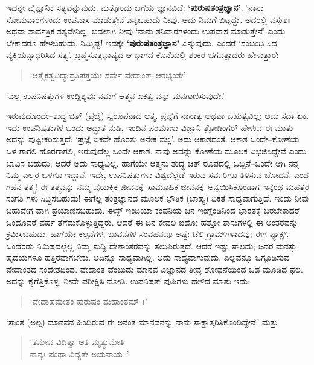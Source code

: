ಇದನ್ನೇ ವೈಜ್ಞಾನಿಕ ಸತ್ಯವೆನ್ನುವುದು. ಮತ್ತೊಂದು ಬಗೆಯ ಜ್ಞಾನವಿದೆ: \textbf{‘ಪುರುಷತಂತ್ರಜ್ಞಾನ’}. ‘ನಾನು ಸೋಮವಾರಗಳಂದು ಉಪವಾಸ ಮಾಡುತ್ತೇನೆ’ಎನ್ನಬಹುದು ನೀವು. ಅದು ನಿಮಗೆ ಬಿಟ್ಟದ್ದು. ಅದರಲ್ಲಿ ವಸ್ತುಶಃ ಅಥವಾ ಸಾರ್ವತ್ರಿಕ ಸತ್ಯವೇನಿಲ್ಲ. ಬದಲಾಗಿ ನೀವು ‘ನಾನು ಶನಿವಾರಗಳಂದು ಉಪವಾಸ ಮಾಡುತ್ತೇನೆ’ ಎಂದು ಬೇಕಾದರೂ ಹೇಳಬಹುದು. ನಿಮ್ಮಿಷ್ಟ! ಇದಕ್ಕೇ \textbf{‘ಪುರುಷತಂತ್ರಜ್ಞಾನ’} ಎನ್ನುವುದು. ಎಂದರೆ ‘ಸಂಬಂಧಿ ಸಿದ ವ್ಯಕ್ತಿಯನ್ನಾಧರಿಸಿದ ಸತ್ಯ’. ಬ್ರಹ್ಮಸೂತ್ರಭಾಷ್ಯದ ಆ ಭಾಗದ ಕೊನೆಯಲ್ಲಿ ಶಂಕರ ಭಗವತ್ಪಾದರು ಹೇಳುತ್ತಾರೆ:

\begin{verse}
‘ಆತ್ಮೈಕತ್ವವಿದ್ಯಾಪ್ರತಿಪತ್ತಯೇ ಸರ್ವೇ ವೇದಾಂತಾ ಆರಭ್ಯಂತೇ’
\end{verse}

‘ಎಲ್ಲ ಉಪನಿಷತ್ತುಗಳ ಉದ್ದಿಶ್ಯವೂ ನಮಗೆ ಆತ್ಮನ ಏಕತ್ವ ವನ್ನು ಮನಗಾಣಿಸುವುದೇ.’

ಇರುವುದೊಂದೇ–ಶುದ್ಧ ಚಿತ್ (ಪ್ರಜ್ಞೆ) ಸ್ವರೂಪನಾದ ಆತ್ಮ. ಪ್ರಜ್ಞೆಗೆ ನಾನಾತ್ವ ಅಥವಾ ಬಹುತ್ವವಿಲ್ಲ; ಅದು ಸದಾ ಏಕ. ಇದು ಉಪನಿಷತ್ತುಗಳ ಒಂದು ಅದ್ಭುತ ನುಡಿ. ಇಂದಿನ ಪರಮಾಣು ವಿಜ್ಞಾನಿ ಶ್ರೋಡಿಂಗರ್ ಹೇಳುವ ಈ ಮಾತು ಅದನ್ನು ಪುಷ್ಟೀಕರಿಸುತ್ತದೆ: ‘ಪ್ರಜ್ಞೆ ಏಕವೇ ಹೊರತು ಅನೇಕ ವಲ್ಲ’. ಅದು ಆಕಾಶದಂತೆ. ಆಕಾಶ ಒಂದೇ–ಕೋಣೆಯ ಒಳ ಗಾಗಲಿ ಹೊರಗಾಗಲಿ, ಇರುವುದೆಲ್ಲ ಒಂದೇ ಆಕಾಶ. ನಾವು ಅದನ್ನು ಕೋಣೆಯ ಮೂಲಕ ವಿಭಜಿಸಿದ್ದೇವೆ ಎಂದು ಬಾವಿಸ ಬಹುದು; ಆದರೆ ಅದು ಸಾಧ್ಯವಿಲ್ಲ. ಹಾಗೆಯೇ ಆತ್ಮನು ಶುದ್ಧ ಚಿತ್ ರೂಪದಲ್ಲಿ ಒಬ್ಬನೆ–ಒಂದೇ ಆಗಿ ನನ್ನ ನಿಮ್ಮ ಎಲ್ಲರ ಒಳಗೂ ಇದ್ದಾನೆ. ಇದೇ, ಉಪನಿಷತ್ತುಗಳು ವಿಶ್ವದೆಲ್ಲೆಡೆ ಇರುವ ಸರ್ವರಿಗೂ ತಿಳಿಸುವ ಬೋಧನೆ. ಎಂಥ ಗಹನ ತತ್ತ್ವ! ಈ ತತ್ತ್ವವನ್ನು ನಮ್ಮ ವೈಯಕ್ತಿಕ ಜೀವನಕ್ಕೆ–ಸಾಮೂಹಿಕ ಜೀವನಕ್ಕೆ–ಅನ್ವಯಿಸಿಕೊಂಡಾಗ ಇನ್ನೆಂಥ ಮಹತ್ತರ ಸಂಗತಿ ಗಳು ಸಿದ್ಧಿಸಬಹುದು! ಈಗೆಲ್ಲ ತಂತ್ರಜ್ಞಾನದ ಮೂಲಕ ಭೌತಿಕ (ಬಾಹ್ಯ) ಏಕತೆ ಸಾಧ್ಯವಾಗುತ್ತಿದೆ. ಇಂದು ನೀವು ಬಹುವೇಗ ವಾಗಿ ಪ್ರಯಾಣಿಸಬಹುದು. ಈಸ್ಟ್ ಇಂಡಿಯಾ ಕಂಪನಿಯ ಜನ ಇಂಗ್ಲೆಂಡಿನಿಂದ ಭಾರತಕ್ಕೆ ಬರಬೇಕಾದರೆ ಒಂದೂವರೆ ವರ್ಷ ತೆಗೆದುಕೊಳ್ಳುತ್ತಿದ್ದರು. ಆದರೆ ಈ ದಿನ ಕೇವಲ ಐದೋ ಹತ್ತೋ ತಾಸುಗಳಲ್ಲಿ ಈ ಅಂತರವನ್ನು ಕ್ರಮಿಸಬಹುದು. ಹಾಗೆಯೇ ಕಲ್ಪನೆಗಳ, ಭಾವನೆಗಳ ಸಂವಹನವೂ ಅಷ್ಟೆ: ಟೆಲಿ ಗ್ರಾಮ್​ಗಳಾದವು; ಈಗ ಫ್ಯಾಕ್ಸ್. ಒಂದೆರಡು ನಿಮಿಷದಲ್ಲೆಲ್ಲ ನಿಮ್ಮ ಸುದ್ದಿ ದೇಶಾಂತರವನ್ನು ತಲುಪಿರುತ್ತದೆ. ಆದರೆ ಇಷ್ಟು ಸಾಲದು; ಜನರ ಮನಸ್ಸು-ಹೃದಯಗಳೂ ಹತ್ತಿರವಾಗಬೇಕು. ಅದಿನ್ನೂ ಸಾಧ್ಯವಾಗಿಲ್ಲ. ಅದು ಸಾಧ್ಯವಾಗುವುದು, ಎಲ್ಲವನ್ನೂ ಒಗ್ಗೂಡಿಸುವ ವೇದಾಂತದ ಸಂದೇಶದಿಂದ. ವೇದಾಂತ ವೆಂಬುದು ಮಾನವ ವಿಜ್ಞಾನದ ತೀವ್ರ ಶೋಧನೆಯಿಂದ ಒಡ ಮೂಡಿದ ಫಲ. ಅದನ್ನು ಕೈಗೆತ್ತಿಕೊಳ್ಳಿ; ನೀವೇ ಪರೀಕ್ಷಿಸಿ ನೋಡಿ. ಉಪನಿಷತ್ ಪುಷಿಗಳು ಹೇಳಿದ ಮಾತು ಇದು:

\begin{verse}
‘ವೇದಾಹಮೇತಂ ಪುರುಷಂ ಮಹಾಂತಮ್ ।’
\end{verse}

‘ಸಾಂತ (ಅಲ್ಪ) ಮಾನವನ ಹಿಂದಿರುವ ಈ ಅನಂತ ಮಾನವನನ್ನು ನಾನು ಸಾಕ್ಷಾತ್ಕರಿಸಿಕೊಂಡಿದ್ದೇನೆ.’ ಮತ್ತು

\begin{verse}
‘ತಮೇವ ವಿದಿತ್ವಾ ಅತಿ ಮೃತ್ಯುಮೇತಿ\\ನಾನ್ಯಃ ಪಂಥಾ ವಿದ್ಯತೇ ಅಯನಾಯ–’
\end{verse}

